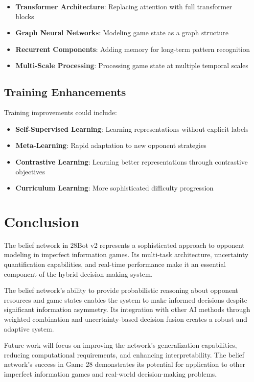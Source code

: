 \documentclass[conference]{IEEEtran}
\begin{document}
\begin{itemize}
    \item \textbf{Transformer Architecture}: Replacing attention with full transformer blocks
    \item \textbf{Graph Neural Networks}: Modeling game state as a graph structure
    \item \textbf{Recurrent Components}: Adding memory for long-term pattern recognition
    \item \textbf{Multi-Scale Processing}: Processing game state at multiple temporal scales
\end{itemize}

\subsection{Training Enhancements}

Training improvements could include:

\begin{itemize}
    \item \textbf{Self-Supervised Learning}: Learning representations without explicit labels
    \item \textbf{Meta-Learning}: Rapid adaptation to new opponent strategies
    \item \textbf{Contrastive Learning}: Learning better representations through contrastive objectives
    \item \textbf{Curriculum Learning}: More sophisticated difficulty progression
\end{itemize}

\section{Conclusion}

The belief network in 28Bot v2 represents a sophisticated approach to opponent modeling in imperfect information games. Its multi-task architecture, uncertainty quantification capabilities, and real-time performance make it an essential component of the hybrid decision-making system.

The belief network's ability to provide probabilistic reasoning about opponent resources and game states enables the system to make informed decisions despite significant information asymmetry. Its integration with other AI methods through weighted combination and uncertainty-based decision fusion creates a robust and adaptive system.

Future work will focus on improving the network's generalization capabilities, reducing computational requirements, and enhancing interpretability. The belief network's success in Game 28 demonstrates its potential for application to other imperfect information games and real-world decision-making problems.
\end{document}
